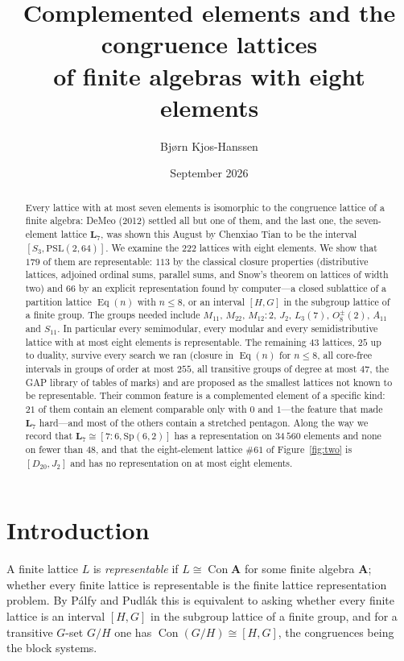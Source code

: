 \documentclass[11pt]{article}
\title{Complemented elements and the congruence lattices\\of finite algebras with eight elements}
\author{Bj{\o}rn Kjos-Hanssen}
\date{September 2026}
\theoremstyle{remark}
\newcommand{\Con}{\operatorname{Con}}
\newcommand{\Eq}{\operatorname{Eq}}
\newcommand{\LL}{\mathbf{L}_7}
\newcommand{\lat}[1]{\##1}
\begin{document}
\maketitle

\begin{abstract}
Every lattice with at most seven elements is isomorphic to the congruence lattice of a finite
algebra: DeMeo (2012) settled all but one of them, and the last one, the seven-element lattice
$\LL$, was shown this August by Chenxiao Tian to be the interval $[S_3,\mathrm{PSL}(2,64)]$.
We examine the $222$ lattices with eight elements. We show that $179$ of them are representable:
$113$ by the classical closure properties (distributive lattices, adjoined ordinal sums, parallel
sums, and Snow's theorem on lattices of width two) and $66$ by an explicit representation found by
computer---a closed sublattice of a partition lattice $\Eq(n)$ with $n\le 8$, or an interval
$[H,G]$ in the subgroup lattice of a finite group. The groups needed include $M_{11}$, $M_{22}$,
$M_{12}{:}2$, $J_2$, $L_3(7)$, $O_8^\pm(2)$, $A_{11}$ and $S_{11}$. In particular every
semimodular, every modular and every semidistributive lattice with at most eight elements is
representable. The remaining $43$ lattices, $25$ up to duality, survive every search we ran (closure
in $\Eq(n)$ for $n\le 8$, all core-free intervals in groups of order at most $255$, all transitive
groups of degree at most $47$, the GAP library of tables of marks) and are proposed as the smallest
lattices not known to be representable. Their common feature is a complemented element of a
specific kind: $21$ of them contain an element comparable only with $0$ and $1$---the feature that
made $\LL$ hard---and most of the others contain a stretched pentagon. Along the way we record that
$\LL\cong[7{:}6,\mathrm{Sp}(6,2)]$ has a representation on $34\,560$ elements and none on fewer
than $48$, and that the eight-element lattice $\lat{61}$ of Figure~\ref{fig:two} is
$[D_{20},J_2]$ and has no representation on at most eight elements.
\end{abstract}

\section{Introduction}

A finite lattice $L$ is \emph{representable} if $L\cong\Con\mathbf A$ for some finite algebra
$\mathbf A$; whether every finite lattice is representable is the finite lattice representation
problem. By P\'alfy and Pudl\'ak \cite{PP} this is equivalent to asking whether every finite
lattice is an interval $[H,G]$ in the subgroup lattice of a finite group, and for a transitive
$G$-set $G/H$ one has $\Con(G/H)\cong[H,G]$, the congruences being the block systems.
\end{document}
